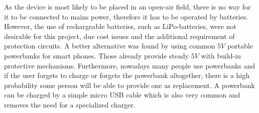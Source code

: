 \noindent As the device is most likely to be placed in an open-air field, there is no way for it to be connected to mains power, therefore it has to be operated by batteries. However, the use of rechargeable batteries, such as LiPo-batteries, were not desirable for this project, due cost issues and the additional requirement of protection circuits. A better alternative was found by using common $5V$ portable powerbanks for smart phones. Those already provide steady $5V$ with build-in protective mechanisms. Furthermore, nowadays many people use powerbanks and if the user forgets to charge or forgets the powerbank altogether, there is a high probability some person will be able to provide one as replacement. A powerbank can be charged by a simple micro USB cable which is also very common and removes the need for a specialized charger.


\pagebreak